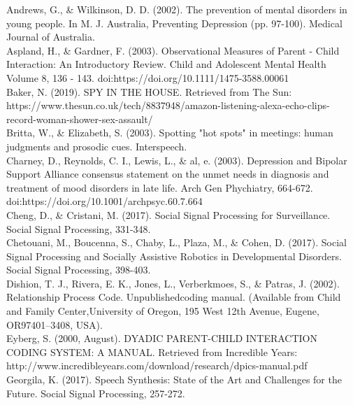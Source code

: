 \documentclass[a4paper,11pt]{report}
\begin{document}
Andrews, G., \& Wilkinson, D. D. (2002). The prevention of mental disorders in young people. In M. J. Australia, Preventing Depression (pp. 97-100). Medical Journal of Australia.\\

Aspland, H., \& Gardner, F. (2003). Observational Measures of Parent - Child Interaction: An Introductory Review. Child and Adolescent Mental Health Volume 8, 136 - 143. doi:https://doi.org/10.1111/1475-3588.00061\\

Baker, N. (2019). SPY IN THE HOUSE. Retrieved from The Sun: https://www.thesun.co.uk/tech/8837948/amazon-listening-alexa-echo-clips-record-woman-shower-sex-assault/\\

Britta, W., \& Elizabeth, S. (2003). Spotting "hot spots" in meetings: human judgments and prosodic cues. Interspeech.\\

Charney, D., Reynolds, C. I., Lewis, L., \& al, e. (2003). Depression and Bipolar Support Alliance consensus statement on the unmet needs in diagnosis and treatment of mood disorders in late life. Arch Gen Phychiatry, 664-672. doi:https://doi.org/10.1001/archpsyc.60.7.664\\

Cheng, D., \& Cristani, M. (2017). Social Signal Processing for Surveillance. Social Signal Processing, 331-348.\\

Chetouani, M., Boucenna, S., Chaby, L., Plaza, M., \& Cohen, D. (2017). Social Signal Processing and Socially Assistive Robotics in Developmental Disorders. Social Signal Processing, 398-403.\\

Dishion, T. J., Rivera, E. K., Jones, L., Verberkmoes, S., \& Patras, J. (2002). Relationship Process Code. Unpublishedcoding manual. (Available from Child and Family Center,University of Oregon, 195 West 12th Avenue, Eugene, OR97401–3408, USA).\\

Eyberg, S. (2000, August). DYADIC PARENT-CHILD INTERACTION CODING SYSTEM: A MANUAL. Retrieved from Incredible Years: http://www.incredibleyears.com/download/research/dpics-manual.pdf\\

Georgila, K. (2017). Speech Synthesis: State of the Art and Challenges for the Future. Social Signal Processing, 257-272.\\
\end{document}
